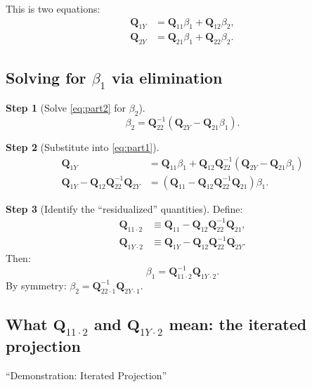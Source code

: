\documentclass[12pt]{article}
\newcommand{\bfQ}{\mathbf{Q}}
\theoremstyle{definition}
\newtheorem{step}{Step}
\begin{document}
This is two equations:
\begin{align}
\bfQ_{1Y} &= \bfQ_{11}\beta_1 + \bfQ_{12}\beta_2, \label{eq:part1}\\
\bfQ_{2Y} &= \bfQ_{21}\beta_1 + \bfQ_{22}\beta_2. \label{eq:part2}
\end{align}

\subsection{Solving for $\beta_1$ via elimination}

\begin{step}[Solve \eqref{eq:part2} for $\beta_2$]
\[
\beta_2 = \bfQ_{22}^{-1}(\bfQ_{2Y} - \bfQ_{21}\beta_1).
\]
\end{step}

\begin{step}[Substitute into \eqref{eq:part1}]
\begin{align*}
\bfQ_{1Y} &= \bfQ_{11}\beta_1 + \bfQ_{12}\bfQ_{22}^{-1}(\bfQ_{2Y} - \bfQ_{21}\beta_1)\\
\bfQ_{1Y} - \bfQ_{12}\bfQ_{22}^{-1}\bfQ_{2Y} &= (\bfQ_{11} - \bfQ_{12}\bfQ_{22}^{-1}\bfQ_{21})\beta_1.
\end{align*}
\end{step}

\begin{step}[Identify the ``residualized'' quantities]
Define:
\begin{align*}
\bfQ_{11\cdot 2} &\equiv \bfQ_{11} - \bfQ_{12}\bfQ_{22}^{-1}\bfQ_{21}, \\
\bfQ_{1Y\cdot 2} &\equiv \bfQ_{1Y} - \bfQ_{12}\bfQ_{22}^{-1}\bfQ_{2Y}.
\end{align*}
Then:
\begin{equation}
\boxed{\beta_1 = \bfQ_{11\cdot 2}^{-1}\bfQ_{1Y\cdot 2}.} \label{eq:beta1part}
\end{equation}
By symmetry: $\beta_2 = \bfQ_{22\cdot 1}^{-1}\bfQ_{2Y\cdot 1}$.
\end{step}

\subsection{What $\bfQ_{11\cdot 2}$ and $\bfQ_{1Y\cdot 2}$ mean: the iterated projection}

\begin{tcolorbox}[colback=blue!5, colframe=blue!50, title=Slide Reference]
``Demonstration: Iterated Projection''
\end{tcolorbox}
\end{document}
